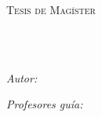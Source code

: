 \documentclass[
11pt, %
oneside, %
spanish,%
english, %
singlespacing, %
parskip, %
headsepline, %
table
]{MastersDoctoralThesis} %
\author{Felipe Jesús Meneses Machuca} %
\begin{document}
\frontmatter %

\pagestyle{plain} %


\begin{titlepage}
\begin{center}

\vspace*{.06\textheight}
{\scshape\LARGE \univname\par}\vspace{1.5cm} %
\textsc{\Large Tesis de Magíster}\\[0.5cm] %

\HRule \\[0.4cm] %
{\LARGE \bfseries \ttitle\par}\vspace{0.4cm} %
\HRule \\[1.5cm] %
 
\begin{minipage}[t]{0.4\textwidth}
\begin{flushleft} \large
\emph{Autor:}\\
{\authorname} %
\end{flushleft}
\end{minipage}
\begin{minipage}[t]{0.4\textwidth}
\begin{flushright} \large
\emph{Profesores guía:} \\
\supname\\
\vspace{5mm}
\end{flushright}
\end{minipage}\\[2.5cm]
 

\end{center}
\end{titlepage}
\end{document}
